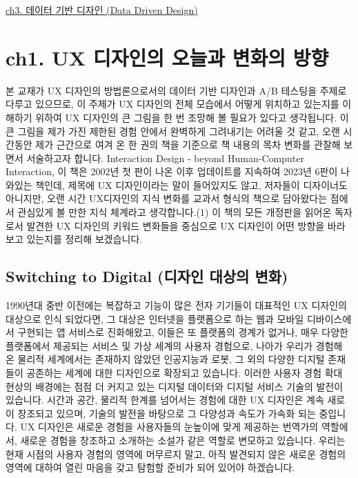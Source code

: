 \documentclass[
  letterpaper,
]{book}
\begin{document}
\href{ch3.\%20데이터\%20기반\%20디자인\%20(Data\%20Driven\%20Design).qmd}{ch3.
데이터 기반 디자인 (Data Driven Design)}

\chapter{ch1. UX 디자인의 오늘과 변화의
방향}\label{ch1.-ux-uxb514uxc790uxc778uxc758-uxc624uxb298uxacfc-uxbcc0uxd654uxc758-uxbc29uxd5a5}

본 교재가 UX 디자인의 방법론으로서의 데이터 기반 디자인과 A/B 테스팅을
주제로 다루고 있으므로, 이 주제가 UX 디자인의 전체 모습에서 어떻게
위치하고 있는지를 이해하기 위하여 UX 디자인의 큰 그림을 한 번 조망해 볼
필요가 있다고 생각됩니다. 이 큰 그림을 제가 가진 제한된 경험 안에서
완벽하게 그려내기는 어려울 것 같고, 오랜 시간동안 제가 근간으로 여겨 온
한 권의 책을 기준으로 책 내용의 목차 변화를 관찰해 보면서 서술하고자
합니다. Interaction Design - beyond Human-Computer Interaction, 이 책은
2002년 첫 판이 나온 이후 업데이트를 지속하여 2023년 6판이 나와있는
책인데, 제목에 UX 디자인이라는 말이 들어있지도 않고, 저자들이 디자이너도
아니지만, 오랜 시간 UX디자인의 지식 변화를 교과서 형식의 책으로
담아왔다는 점에서 관심있게 볼 만한 지식 체계라고 생각합니다.(1) 이 책의
모든 개정판을 읽어온 독자로서 발견한 UX 디자인의 키워드 변화들을
중심으로 UX 디자인이 어떤 방향을 바라보고 있는지를 정리해 보겠습니다.

\section{Switching to Digital (디자인 대상의
변화)}\label{switching-to-digital-uxb514uxc790uxc778-uxb300uxc0c1uxc758-uxbcc0uxd654}

1990년대 중반 이전에는 복잡하고 기능이 많은 전자 기기들이 대표적인 UX
디자인의 대상으로 인식 되었다면, 그 대상은 인터넷을 플랫폼으로 하는 웹과
모바일 디바이스에서 구현되는 앱 서비스로 진화해왔고, 이들은 또 플랫폼의
경계가 없거나, 매우 다양한 플랫폼에서 제공되는 서비스 및 가상 세계의
사용자 경험으로, 나아가 우리가 경험해 온 물리적 세계에서는 존재하지
않았던 인공지능과 로봇, 그 외의 다양한 디지털 존재들이 공존하는 세계에
대한 디자인으로 확장되고 있습니다. 이러한 사용자 경험 확대 현상의
배경에는 점점 더 커지고 있는 디지털 데이터와 디지털 서비스 기술의 발전이
있습니다. 시간과 공간, 물리적 한계를 넘어서는 경험에 대한 UX 디자인은
계속 새로이 창조되고 있으며, 기술의 발전을 바탕으로 그 다양성과 속도가
가속화 되는 중입니다. UX 디자인은 새로운 경험을 사용자들의 눈높이에 맞게
제공하는 번역가의 역할에서, 새로운 경험을 창조하고 소개하는 소설가 같은
역할로 변모하고 있습니다. 우리는 현재 시점의 사용자 경험의 영역에
머무르지 말고, 아직 발견되지 않은 새로운 경험의 영역에 대하여 열린
마음을 갖고 탐험할 준비가 되어 있어야 하겠습니다.
\end{document}
